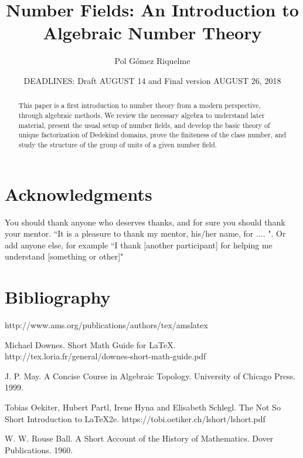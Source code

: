 \documentclass[psamsfonts]{amsart}
\title{Number Fields: An Introduction to Algebraic Number Theory}
\author{Pol Gómez Riquelme}
\date{DEADLINES: Draft AUGUST 14 and Final version AUGUST 26, 2018}
\theoremstyle{definition}
\theoremstyle{remark}
\numberwithin{equation}{section}
\begin{document}
\begin{abstract}

This paper is a first introduction to number theory from a modern perspective, through algebraic methods. We review the necessary algebra to understand later material, present the usual setup of number fields, and develop the basic theory of unique factorization of Dedekind domains, prove the finiteness of the class number, and study the structure of the group of units of a given number field.

\end{abstract}

\maketitle

\tableofcontents











\section*{Acknowledgments}  You should thank anyone who deserves thanks, and for sure you should
thank your mentor.   ``It is a pleasure to thank my mentor, 
his/her name, for ....  ".   Or add anyone else, for example ``I thank [another participant] for helping 
me understand [something or other]"

\section{Bibliography}

\begin{thebibliography}{9}

 http://www.ams.org/publications/authors/tex/amslatex

Michael Downes.
Short Math Guide for \LaTeX.
http://tex.loria.fr/general/downes-short-math-guide.pdf

J. P. May.
A Concise Course in Algebraic Topology.
University of Chicago Press. 1999. 

Tobias Oekiter, Hubert Partl, Irene Hyna and Elisabeth Schlegl.
The Not So Short Introduction to \LaTeX 2e.
https://tobi.oetiker.ch/lshort/lshort.pdf

W. W. Rouse Ball.
A Short Account of the History of Mathematics.
Dover Publications. 1960.

\end{thebibliography}
\end{document}
